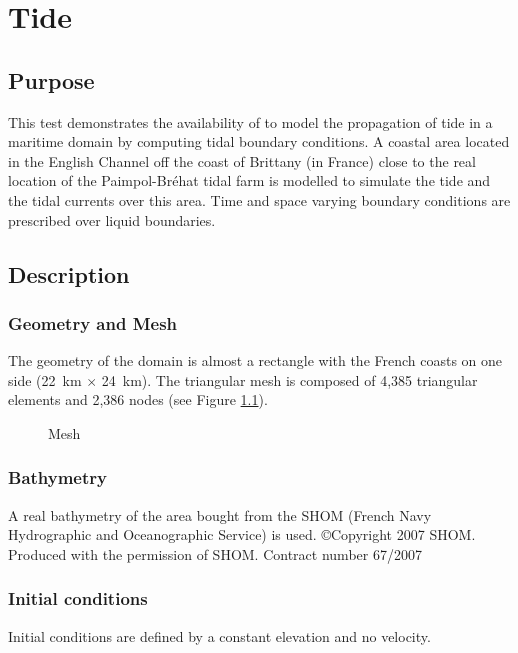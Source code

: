 \chapter{Tide}
%
%
\section{Purpose}

This test demonstrates the availability of  to model the
propagation of tide in a maritime domain by computing tidal
boundary conditions.
A coastal area located in the English Channel off the coast of
Brittany (in France) close to the real location of the Paimpol-Bréhat
tidal farm is modelled to simulate the tide and the tidal currents
over this area.
Time and space varying boundary conditions are prescribed over
liquid boundaries.
%
\section{Description}

\subsection{Geometry and Mesh}

The geometry of the domain is almost a rectangle with the French coasts on
one side (22~km $\times$ 24~km).
The triangular mesh is composed of 4,385 triangular elements and 2,386 nodes
(see Figure \ref{fig:tide:mesh}).

\begin{figure}[H]
 \centering
  \caption{Mesh}\label{fig:tide:mesh}
\end{figure}

\subsection{Bathymetry}
%
A real bathymetry of the area bought from the SHOM (French Navy
Hydrographic and Oceanographic Service) is used.
\copyright Copyright 2007 SHOM. Produced with the permission of SHOM.
Contract number 67/2007

\subsection{Initial conditions}
%
Initial conditions are defined by a constant elevation and no velocity.
%
